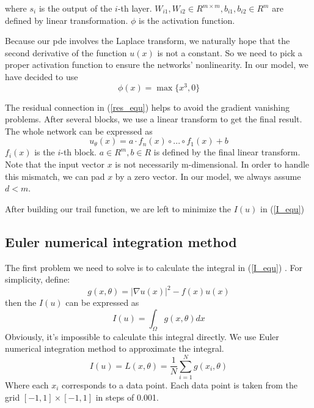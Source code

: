 \documentclass{article}
\begin{document}
where $s_{i}$ is the output of the $i$-th layer. $W_{i1},W_{i2}\in R^{m\times m},b_{i1},b_{i2}\in R^{m}$ are defined by linear transformation. $\phi$ is the activation function.

\par Because our pde involves the Laplace transform, we naturally hope that the second derivative of the function $u(x)$ is not a constant. So we need to pick a proper activation function to ensure the networks' nonlinearity. In our model, we have decided to use 
\begin{equation}
\phi(x)=\max\{x^3,0\} 
\end{equation}

\par The residual connection in (\ref{res_equ})
helps to avoid the gradient vanishing problems.
After several blocks, we use a linear transform to get the final result. The whole network can be expressed as
\begin{equation}
u_{\theta}(x)=a\cdot f_n(x) \circ ...\circ f_1(x)+b
\end{equation}
$f_i(x)$ is the $i$-th block. $a\in R^m,b\in R$ is defined by the final linear transform. Note that the input vector $x$ is not necessarily m-dimensional. In order to handle this mismatch, we can pad $x$ by a zero vector. In our model, we always assume $d<m$.
\par After building our trail function, we are left to minimize the $I(u)$ in (\ref{I_equ})

\subsection{Euler numerical integration method}
\par The first problem we need to solve is to calculate the integral in (\ref{I_equ})
 . For simplicity, define:
 \begin{equation}
 g(x,\theta)=|\nabla u(x)|^2-f(x)u(x)
 \end{equation}
 then the $I(u)$ can be expressed as
 \begin{equation}
 I(u)=\int _{\Omega}g(x,\theta)dx
 \end{equation}
 Obviously, it's impossible to calculate this integral directly. We use Euler numerical integration method to approximate the integral.
 \begin{equation}
 I(u)=L(x,\theta)=\frac{1}{N}\sum\limits_{i=1}^{N}g(x_i,\theta)
 \end{equation}
 Where each $x_i$ corresponds to a data point. Each data point is taken from the grid $[-1,1]\times [-1,1]$ in steps of 0.001.
\end{document}
